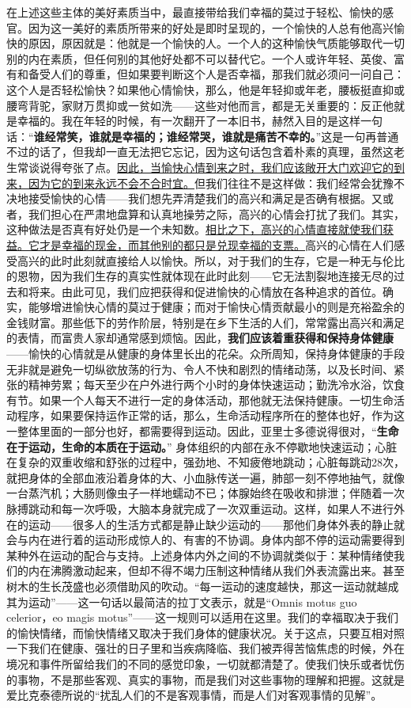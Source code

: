 \documentclass[12pt,oneside]{book}
\begin{document}
在上述这些主体的美好素质当中，最直接带给我们幸福的莫过于轻松、愉快的感官。因为这一美好的素质所带来的好处是即时呈现的，一个愉快的人总有他高兴愉快的原因，原因就是：他就是一个愉快的人。一个人的这种愉快气质能够取代一切别的内在素质，但任何别的其他好处都不可以替代它。一个人或许年轻、英俊、富有和备受人们的尊重，但如果要判断这个人是否幸福，那我们就必须问一问自己：这个人是否轻松愉快？如果他心情愉快，那么，他是年轻抑或年老，腰板挺直抑或腰弯背驼，家财万贯抑或一贫如洗——这些对他而言，都是无关重要的：反正他就是幸福的。我在年轻的时候，有一次翻开了一本旧书，赫然入目的是这样一句话：“\textbf{谁经常笑，谁就是幸福的；谁经常哭，谁就是痛苦不幸的。}”这是一句再普通不过的话了，但我却一直无法把它忘记，因为这句话包含着朴素的真理，虽然这老生常谈说得夸张了点。\uline{因此，当愉快心情到来之时，我们应该敞开大门欢迎它的到来，因为它的到来永远不会不合时宜。}但我们往往不是这样做：我们经常会犹豫不决地接受愉快的心情——我们想先弄清楚我们的高兴和满足是否确有根据。又或者，我们担心在严肃地盘算和认真地操劳之际，高兴的心情会打扰了我们。其实，这种做法是否真有好处仍是一个未知数。\uline{相比之下，高兴的心情直接就使我们获益。它才是幸福的现金，而其他别的都只是兑现幸福的支票。}高兴的心情在人们感受高兴的此时此刻就直接给人以愉快。所以，对于我们的生存，它是一种无与伦比的恩物，因为我们生存的真实性就体现在此时此刻——它无法割裂地连接无尽的过去和将来。由此可见，我们应把获得和促进愉快的心情放在各种追求的首位。确实，能够增进愉快心情的莫过于健康；而对于愉快心情贡献最小的则是充裕盈余的金钱财富。那些低下的劳作阶层，特别是在乡下生活的人们，常常露出高兴和满足的表情，而富贵人家却通常感到烦恼。因此，\textbf{我们应该着重获得和保持身体健康}——愉快的心情就是从健康的身体里长出的花朵。众所周知，保持身体健康的手段无非就是避免一切纵欲放荡的行为、令人不快和剧烈的情绪动荡，以及长时间、紧张的精神劳累；每天至少在户外进行两个小时的身体快速运动；勤洗冷水浴，饮食有节。如果一个人每天不进行一定的身体活动，那他就无法保持健康。一切生命活动程序，如果要保持运作正常的话，那么，生命活动程序所在的整体也好，作为这一整体里面的一部分也好，都需要得到运动。因此，亚里士多德说得很对，“\textbf{生命在于运动，生命的本质在于运动。}” 身体组织的内部在永不停歇地快速运动；心脏在复杂的双重收缩和舒张的过程中，强劲地、不知疲倦地跳动；心脏每跳动28次，就把身体的全部血液沿着身体的大、小血脉传送一遍，肺部一刻不停地抽气，就像一台蒸汽机；大肠则像虫子一样地蠕动不已；体腺始终在吸收和排泄；伴随着一次脉搏跳动和每一次呼吸，大脑本身就完成了一次双重运动。这样，如果人不进行外在的运动——很多人的生活方式都是静止缺少运动的——那他们身体外表的静止就会与内在进行着的运动形成惊人的、有害的不协调。身体内部不停的运动需要得到某种外在运动的配合与支持。上述身体内外之间的不协调就类似于：某种情绪使我们的内在沸腾激动起来，但却不得不竭力压制这种情绪从我们外表流露出来。甚至树木的生长茂盛也必须借助风的吹动。“每一运动的速度越快，那这一运动就越成其为运动”——这一句话以最简洁的拉丁文表示，就是“Omnis motus guo celerior，eo magis motus”——这一规则可以适用在这里。我们的幸福取决于我们的愉快情绪，而愉快情绪又取决于我们身体的健康状况。关于这点，只要互相对照一下我们在健康、强壮的日子里和当疾病降临、我们被弄得苦恼焦虑的时候，外在境况和事件所留给我们的不同的感觉印象，一切就都清楚了。使我们快乐或者忧伤的事物，不是那些客观、真实的事物，而是我们对这些事物的理解和把握。这就是爱比克泰德所说的“扰乱人们的不是客观事情，而是人们对客观事情的见解”。
\end{document}

